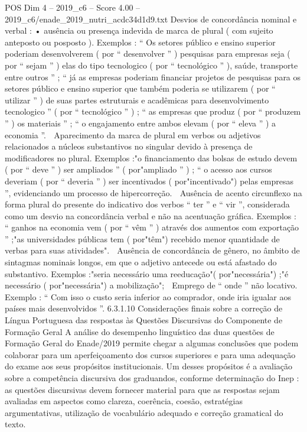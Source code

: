 \begin{textsample}{POS Dim 4 – 2019\_c6 – Score 4.00 – 2019\_c6/enade\_2019\_nutri\_acdc34d1d9.txt}
Desvios de concordância nominal e verbal : • ausência ou presença indevida de marca de plural ( com sujeito anteposto ou posposto ).
Exemplos : “ Os setores público e ensino superior poderiam desenvolverem ( por “ desenvolver ” ) pesquisas para empresas seja ( por “ sejam ” ) elas do tipo tecnologico ( por “ tecnológico ” ), saúde, transporte entre outros ” ; “ já as empresas poderiam financiar projetos de pesquisas para os setores público e ensino superior que também poderia se utilizarem ( por “ utilizar ” ) de suas partes estruturais e acadêmicas para desenvolvimento tecnologico ” ( por “ tecnológico ” ) ; “ as empresas que produz ( por “ produzem ” ) os materiais ” ; “ o engajamento entre ambos elevam ( por “ eleva ” ) a economia ”.  Aparecimento da marca de plural em verbos ou adjetivos relacionados a núcleos substantivos no singular devido à presença de modificadores no plural.
Exemplos :"o financiamento das bolsas de estudo devem ( por “ deve ” ) ser ampliados ” ( por"ampliado ” ) ; “ o acesso aos cursos deveriam ( por “ deveria ” ) ser incentivados ( por"incentivado") pelas empresas ”, evidenciando um processo de hipercorreção.  Ausência de acento circunflexo na forma plural do presente do indicativo dos verbos “ ter ” e “ vir ”, considerada como um desvio na concordância verbal e não na acentuação gráfica.
Exemplos : “ ganhos na economia vem ( por “ vêm ” ) através dos aumentos com exportação ” ;"as universidades públicas tem ( por"têm") recebido menor quantidade de verbas para suas atividades".  Ausência de concordância de gênero, no âmbito de sintagmas nominais longos, em que o adjetivo antecede ou está afastado do substantivo.
Exemplos :"seria necessário uma reeducação"( por"necessária") ;"é necessário ( por"necessária") a mobilização";  Emprego de “ onde ” não locativo.
Exemplo : “ Com isso o custo seria inferior ao comprador, onde iria igualar aos países mais desenvolvidos ”. 6.3.1.10 Considerações finais sobre a correção de Língua Portuguesa das respostas às Questões Discursivas do Componente de Formação Geral A análise do desempenho linguístico das duas questões de Formação Geral do Enade/2019 permite chegar a algumas conclusões que podem colaborar para um aperfeiçoamento dos cursos superiores e para uma adequação do exame aos seus propósitos institucionais.
Um desses propósitos é a avaliação sobre a competência discursiva dos graduandos, conforme determinação do Inep : as questões discursivas devem fornecer material para que as respostas sejam avaliadas em aspectos como clareza, coerência, coesão, estratégias argumentativas, utilização de vocabulário adequado e correção gramatical do texto.

\end{textsample}
